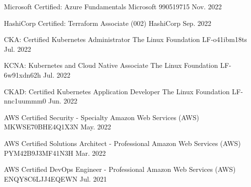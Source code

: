 

\begin{cvhonors}

  \cvhonor
    {Microsoft Certified: Azure Fundamentals} %
    {Microsoft} %
    {990519715} %
    {Nov. 2022} %

  \cvhonor
    {HashiCorp Certified: Terraform Associate (002)} %
    {HashiCorp} %
    {} %
    {Sep. 2022} %

  \cvhonor
    {CKA: Certified Kubernetes Administrator} %
    {The Linux Foundation} %
    {LF-o41ibm18ts} %
    {Jul. 2022} %

  \cvhonor
    {KCNA: Kubernetes and Cloud Native Associate} %
    {The Linux Foundation} %
    {LF-6w91xdn62h} %
    {Jul. 2022} %

  \cvhonor
    {CKAD: Certified Kubernetes Application Developer} %
    {The Linux Foundation} %
    {LF-nnc1uummm0} %
    {Jun. 2022} %

  \cvhonor
    {AWS Certified Security - Specialty} %
    {Amazon Web Services (AWS)} %
    {MKWSE70BHE4Q1X3N} %
    {May. 2022} %

  \cvhonor
    {AWS Certified Solutions Architect - Professional} %
    {Amazon Web Services (AWS)} %
    {PYM42B9J3MF41N3H} %
    {Mar. 2022} %

\cvhonor
  {AWS Certified DevOps Engineer - Professional} %
  {Amazon Web Services (AWS)} %
  {ENQY8C6LJJ4EQEWN} %
  {Jul. 2021} %


\end{cvhonors}

